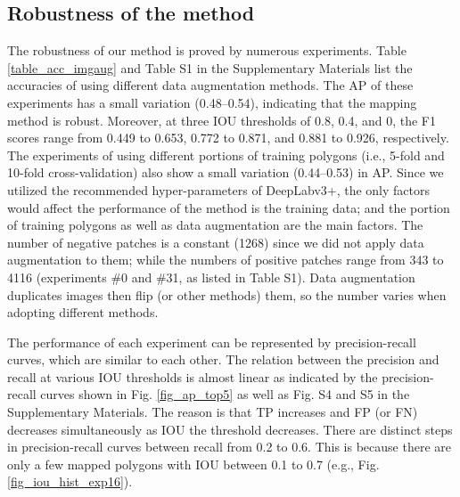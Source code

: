 \documentclass[preprint,12pt,authoryear]{elsarticle}
\begin{document}
\subsection{Robustness of the method}
\label{subsec_robustness}

The robustness of our method is proved by numerous experiments. Table \ref{table_acc_imgaug} and Table S1 in the Supplementary Materials list the accuracies of using different data augmentation methods. The AP of these experiments has a small variation (0.48--0.54), indicating that the mapping method is robust. Moreover, at three IOU thresholds of 0.8, 0.4, and 0, the F1 scores range from 0.449 to 0.653, 0.772 to 0.871, and 0.881 to 0.926, respectively. The experiments of using different portions of training polygons (i.e., 5-fold and 10-fold cross-validation) also show a small variation (0.44--0.53) in AP. Since we utilized the recommended hyper-parameters of DeepLabv3+, the only factors would affect the performance of the method is the training data; and the portion of training polygons as well as data augmentation are the main factors. The number of negative patches is a constant (1268) since we did not apply data augmentation to them; while the numbers of positive patches range from 343 to 4116 (experiments \#0 and \#31, as listed in Table S1). Data augmentation duplicates images then flip (or other methods) them, so the number varies when adopting different methods.

The performance of each experiment can be represented by precision-recall curves, which are similar to each other. The relation between the precision and recall at various IOU thresholds is almost linear as indicated by the precision-recall curves shown in Fig. \ref{fig_ap_top5} as well as Fig. S4 and S5 in the Supplementary Materials. The reason is that TP increases and FP (or FN) decreases simultaneously as IOU the threshold decreases. There are distinct steps in precision-recall curves between recall from 0.2 to 0.6. This is because there are only a few mapped polygons with IOU between 0.1 to 0.7 (e.g., Fig. \ref{fig_iou_hist_exp16}).
\end{document}
